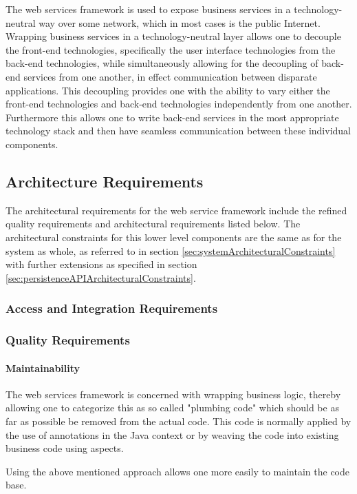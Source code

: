 The web services framework is used to expose business services in a
technology-neutral way over some network, which in most cases is the public
Internet.  Wrapping business services in a technology-neutral layer allows
one to decouple the front-end technologies, specifically the user interface
technologies from the back-end technologies, while simultaneously allowing for the decoupling
of back-end services from one another, in effect communication between disparate
applications.  This decoupling provides one with the ability to vary either the
front-end technologies and back-end technologies independently from one
another.  Furthermore this allows one to write back-end services in the most
appropriate technology stack and then have seamless communication between these
individual components.

\subsection{Architecture Requirements}
The architectural requirements for the web service framework include the
refined quality requirements and architectural requirements listed below. The
architectural constraints for this lower level components are the same as for
the system as whole, as referred to in section \ref{sec:systemArchitecturalConstraints}
with further extensions as specified in section \ref{sec:persistenceAPIArchitecturalConstraints}.

\subsubsection{Access and Integration Requirements}
\subsubsection{Quality Requirements}
\paragraph{Maintainability}
\label{sec:webServicesFrameworkMaintainability}
The web services framework is concerned with wrapping business logic, thereby
allowing one to categorize this as so called "plumbing code" which should be as
far as possible be removed from the actual code. This code is normally applied
by the use of annotations in the Java context or by weaving the code into
existing business code using aspects.

Using the above mentioned approach allows one more easily to maintain the code
base.

